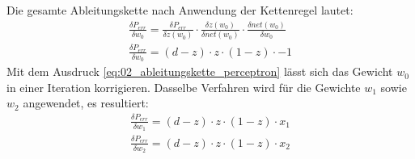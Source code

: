 Die gesamte Ableitungskette nach Anwendung der Kettenregel lautet:
\begin{align}
    \frac{\delta P_{err}}{\delta w_0} = \frac{\delta P_{err}}{\delta z(w_0)} \cdot \frac{\delta z(w_0)}{\delta net(w_0)} \cdot \frac{\delta net(w_0)}{\delta w_0}\\
    \frac{\delta P_{err}}{\delta w_0} = (d - z) \cdot z \cdot (1 - z) \cdot -1\label{eq:02_ableitungskette_perceptron}
\end{align}
Mit dem Ausdruck \ref{eq:02_ableitungskette_perceptron} lässt sich das Gewicht $w_0$ in einer Iteration korrigieren.
Dasselbe Verfahren wird für die Gewichte $w_1$ sowie $w_2$ angewendet, es resultiert:
\begin{align}
    \frac{\delta P_{err}}{\delta w_1} = (d - z) \cdot z \cdot (1 - z) \cdot x_1\\
    \frac{\delta P_{err}}{\delta w_2} = (d - z) \cdot z \cdot (1 - z) \cdot x_2
\end{align}

\newpage

